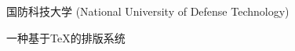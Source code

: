 \begin{denotation}
\item[NUDT] 国防科技大学 (National University of Defense Technology)
\item[\LaTeX] 一种基于\TeX{}的排版系统
\end{denotation}
